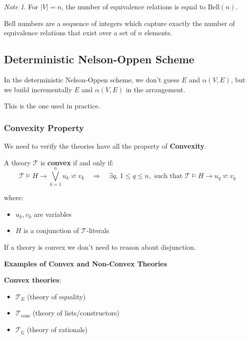 \documentclass[11pt,a4paper]{article}
\theoremstyle{definition}
\theoremstyle{plain}
\theoremstyle{remark}
\newtheorem*{remark}{Note}
\begin{document}
\begin{remark}
For $|V| = n$, the number of equivalence relations is equal to $\text{Bell}(n)$.

Bell numbers are a sequence of integers which capture exactly the number of equivalence relations that exist over a set of $n$ elements.
\end{remark} 

\subsection{Deterministic Nelson-Oppen Scheme}

In the deterministic Nelson-Oppen scheme, we don't guess $E$ and $\alpha(V, E)$, but we build incrementally $E$ and $\alpha(V, E)$ in the arrangement.

This is the one used in practice.

\subsubsection{Convexity Property}

We need to verify the theories have all the property of \textbf{Convexity}.

\begin{tcolorbox}[colback=purple!5!white,colframe=purple!75!black,title=\textbf{Convexity Definition}]
A theory $\mathcal{T}$ is \textbf{convex} if and only if:
\[
\mathcal{T} \models H \rightarrow \bigvee_{k=1}^{n} u_k \backsimeq v_k \quad \Rightarrow \quad \exists q, \, 1 \leq q \leq n, \text{ such that } \mathcal{T} \models H \rightarrow u_q \backsimeq v_q
\]

where:
\begin{itemize}
    \item $u_k, v_k$ are variables
    \item $H$ is a conjunction of $\mathcal{T}$-literals
\end{itemize}
\end{tcolorbox}

If a theory is convex we don't need to reason about disjunction.

\begin{center}
\textbf{Examples of Convex and Non-Convex Theories}
\end{center}

\textbf{Convex theories}:
\begin{itemize}
    \item $\mathcal{T}_E$ (theory of equality)
    \item $\mathcal{T}_{\text{cons}}$ (theory of lists/constructors)
    \item $\mathcal{T}_{\mathbb{Q}}$ (theory of rationals)
\end{itemize}
\end{document}
